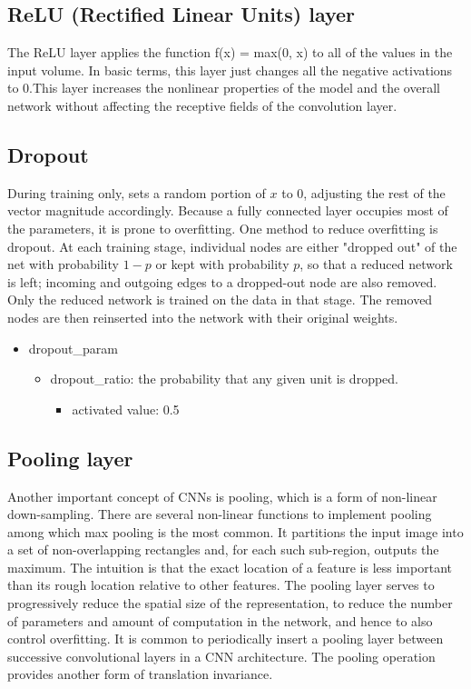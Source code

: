\documentclass[11pt]{article}
\begin{document}
\subsection{ReLU (Rectified Linear Units) layer}
The ReLU layer applies the function f(x) = max(0, x) to all of the values in the input volume. In basic terms, this layer just changes all the negative activations to 0.This layer increases the nonlinear properties of the model and the overall network without affecting the receptive fields of the convolution layer.

\subsection{Dropout}
During training only, sets a random portion of $x$ to 0, adjusting the rest of the vector magnitude accordingly.
Because a fully connected layer occupies most of the parameters, it is prone to overfitting. One method to reduce overfitting is dropout. At each training stage, individual nodes are either "dropped out" of the net with probability $ 1-p$ or kept with probability $p$, so that a reduced network is left; incoming and outgoing edges to a dropped-out node are also removed. Only the reduced network is trained on the data in that stage. The removed nodes are then reinserted into the network with their original weights.
\begin{itemize}
	\item dropout\_param
	\begin{itemize}
		\item dropout\_ratio:  the probability that any given unit is dropped.
		\begin{itemize}
			\item activated value: 0.5
		\end{itemize}
	\end{itemize}
\end{itemize}

\subsection{Pooling layer}
Another important concept of CNNs is pooling, which is a form of non-linear down-sampling. There are several non-linear functions to implement pooling among which max pooling is the most common. It partitions the input image into a set of non-overlapping rectangles and, for each such sub-region, outputs the maximum. The intuition is that the exact location of a feature is less important than its rough location relative to other features. The pooling layer serves to progressively reduce the spatial size of the representation, to reduce the number of parameters and amount of computation in the network, and hence to also control overfitting. It is common to periodically insert a pooling layer between successive convolutional layers in a CNN architecture. The pooling operation provides another form of translation invariance.
\end{document}
